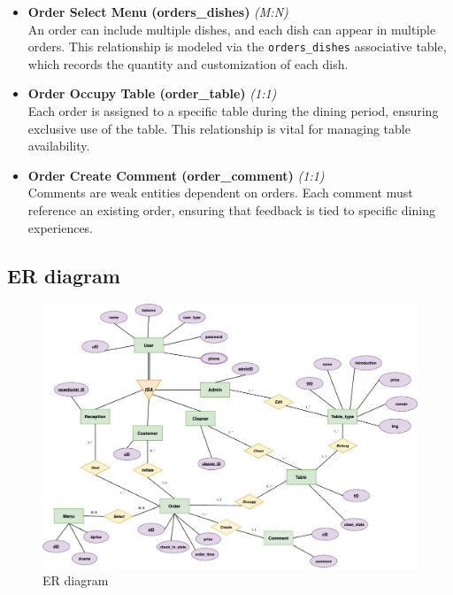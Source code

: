 \documentclass[12pt]{article}
\begin{document}
\begin{itemize}
    \item \textbf{Order Select Menu (orders\_dishes)} \hfill \textit{(M:N)} \\
        An order can include multiple dishes, and each dish can appear in multiple orders. This relationship is modeled via the \texttt{orders\_dishes} associative table, which records the quantity and customization of each dish.
        
    \item \textbf{Order Occupy Table (order\_table)} \hfill \textit{(1:1)} \\
        Each order is assigned to a specific table during the dining period, ensuring exclusive use of the table. This relationship is vital for managing table availability.
        
    \item \textbf{Order Create Comment (order\_comment)} \hfill \textit{(1:1)} \\
        Comments are weak entities dependent on orders. Each comment must reference an existing order, ensuring that feedback is tied to specific dining experiences.
\end{itemize}



\subsection{ER diagram}

\begin{figure}[htbp]
    \centering
    \includegraphics[width=\textwidth]{ER.png} %
    \caption{ER diagram}
    \label{fig:example}
\end{figure}
\end{document}
